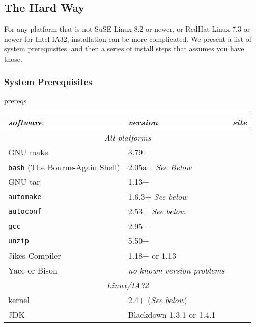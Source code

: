 \subsection{The Hard Way}

 For any platform that is not SuSE Linux 8.2 or newer, or RedHat Linux 7.3 or newer for Intel
IA32, installation can be more complicated.  We present a list of system
prerequisites, and then a series of install steps that assumes you
have those.

\subsubsection{System Prerequisites}

\begin{Label}{prereqs}

\begin{table}[h]
\begin{center}
\begin{tabular}{|l|l|l|} \hline\hline
{\em software} & {\em version} & {\em site} \\ \hline
\multicolumn{3}{|c|}{\em All platforms}                     \\ \hline
GNU make       & 3.79+    & \xlink{\tt \makeURL}{\makeURL}         \\ 
{\tt bash} (The Bourne-Again Shell) & 2.05a+ {\em See Below}   & \xlink{\tt \bashURL}{\bashURL}         \\ 
GNU tar        & 1.13+    & \xlink{\tt \tarURL}{\tarURL}           \\ 
{\tt automake}       & 1.6.3+ {{\em See below}}  & \xlink{\tt \automakeURL}{\automakeURL} \\
{\tt autoconf}       & 2.53+  {{\em See below}}  & \xlink{\tt \autoconfURL}{\autoconfURL} \\
{\tt gcc}            & 2.95+    & \xlink{\tt \gccURL}{\gccURL}           \\
{\tt unzip}          & 5.50+    & \xlink{\tt \unzipURL}{\unzipURL}       \\
Jikes Compiler & 1.18+ or 1.13 & \xlink{\tt \jikesURL}{\jikesURL}       \\
\hline
Yacc or Bison &	{\it no known version problems} &			\\
\multicolumn{3}{|c|}{\em Linux/IA32}                      \\ \hline
kernel         & 2.4+ ({\em See below}) & \xlink{\tt \linuxKernelURL}{\linuxKernelURL} \\
JDK            & Blackdown 1.3.1 or 1.4.1 & \xlink{\tt \BlackdownURL}{\BlackdownURL} \\

\end{tabular}
\end{center}
\end{table}
\end{Label}
